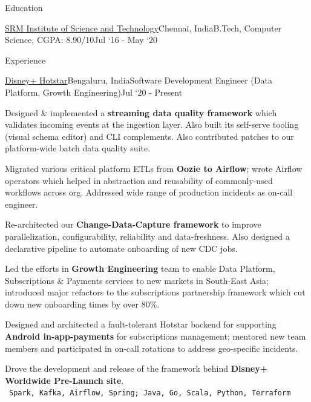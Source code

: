 \documentclass{resume}
\begin{document}
  \begin{rSection}{Education}
    \begin{rEmptySubsection}{\href{https://www.srmist.edu.in/}{SRM Institute of Science and Technology}}{Chennai, India}{B.Tech, Computer Science, CGPA: 8.90/10}{Jul `16 - May `20}
    \end{rEmptySubsection}

  \end{rSection}

  \begin{rSection}{Experience}
  
    \begin{rSubsection}{\href{https://tech.hotstar.com/}{Disney+ Hotstar}}{Bengaluru, India}{Software Development Engineer (Data Platform, Growth Engineering)}{Jul `20 - Present}
      \item Designed \& implemented a \textbf{streaming data quality framework} which validates incoming events at the ingestion layer. Also built its self-serve tooling (visual schema editor) and CLI complements. Also contributed patches to our platform-wide batch data quality suite.
      \item Migrated various critical platform ETLs from \textbf{Oozie to Airflow}; wrote Airflow operators which helped in abstraction and reusability of commonly-used workflows across org. Addressed wide range of production incidents as on-call engineer.
      \item Re-architected our \textbf{Change-Data-Capture framework} to improve parallelization, configurability, reliability and data-freshness. Also designed a declarative pipeline to automate onboarding of new CDC jobs.
      \item Led the efforts in \textbf{Growth Engineering} team to enable Data Platform, Subscriptions \& Payments services to new markets in South-East Asia; introduced major refactors to the subscriptions partnership framework which cut down new onboarding times by over 80\%.
      \item Designed and architected a fault-tolerant Hotstar backend for supporting \textbf{Android in-app-payments} for subscriptions management; mentored new team members and participated in on-call rotations to address geo-specific incidents.
      \item Drove the development and release of the framework behind \textbf{Disney+ Worldwide Pre-Launch site}.\\
    \textbullet\ \texttt{Spark, Kafka, Airflow, Spring; Java, Go, Scala, Python, Terraform}
    \end{rSubsection}
    

\end{rSection}
\end{document}
